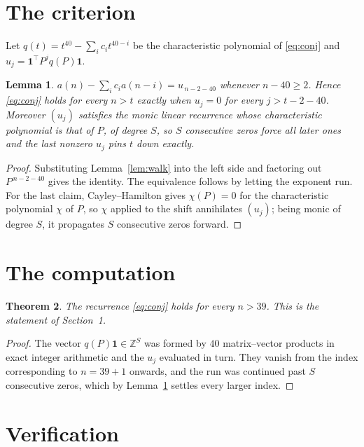 \documentclass[11pt,a4paper]{article}
\theoremstyle{plain}
\newtheorem{theorem}{Theorem}
\newtheorem{lemma}[theorem]{Lemma}
\theoremstyle{definition}
\begin{document}
\section{The criterion}

Let $q(t)=t^{40}-\sum_i c_i t^{40-i}$ be the characteristic polynomial of
\eqref{eq:conj} and $u_j=\mathbf{1}^{\!\top}P^{j}q(P)\mathbf{1}$.

\begin{lemma}\label{lem:crit}
$a(n)-\sum_i c_i a(n-i)=u_{\,n-2-40}$ whenever $n-40\ge2$. Hence
\eqref{eq:conj} holds for every $n>t$ exactly when $u_j=0$ for every
$j>t-2-40$. Moreover $(u_j)$ satisfies the monic linear recurrence whose
characteristic polynomial is that of $P$, of degree $S$, so $S$ consecutive zeros force all
later ones and the last nonzero $u_j$ pins $t$ down exactly.
\end{lemma}

\begin{proof}
Substituting Lemma~\ref{lem:walk} into the left side and factoring out
$P^{\,n-2-40}$ gives the identity. The equivalence follows by letting the exponent
run. For the last claim, Cayley--Hamilton gives $\chi(P)=0$ for the characteristic
polynomial $\chi$ of $P$, so $\chi$ applied to the shift annihilates $(u_j)$; being monic of
degree $S$, it propagates $S$ consecutive zeros forward.
\end{proof}

\section{The computation}

\begin{theorem}
The recurrence \eqref{eq:conj} holds for every $n>39$. This is the statement of
Section~1.
\end{theorem}

\begin{proof}
The vector $q(P)\mathbf{1}\in\mathbb{Z}^{S}$ was formed by $40$ matrix--vector
products in exact integer arithmetic and the $u_j$ evaluated in turn. They vanish from the
index corresponding to $n=39+1$ onwards, and the run was continued past $S$ consecutive
zeros, which by Lemma~\ref{lem:crit} settles every larger index.
\end{proof}

\section{Verification}
\end{document}
